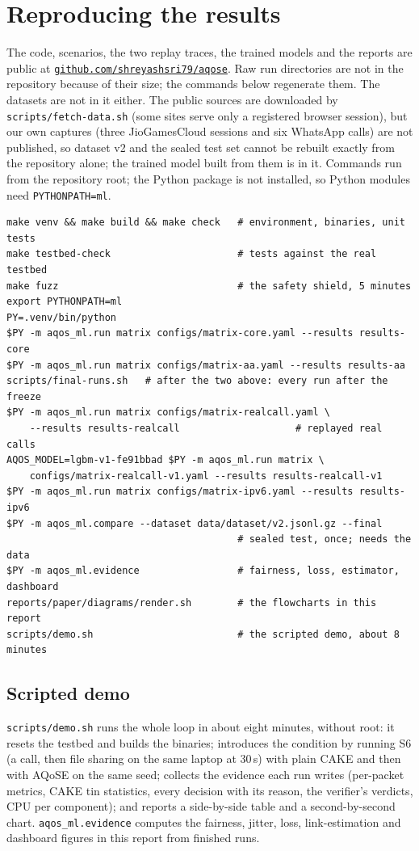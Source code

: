 \documentclass[11pt,a4paper]{article}
\newif\ifnewpage\newpagetrue
\newcommand{\samepagenext}{\global\newpagefalse}
\newcommand{\newpagenext}{\global\newpagetrue}
\begin{document}
\samepagenext
\appendix
\section{Reproducing the results}
\newpagenext
{\sloppy The code, scenarios, the two replay traces, the trained models and the reports are public at \href{https://github.com/shreyashsri79/aqose}{\texttt{github.com/shreyashsri79/aqose}}. Raw run directories are not in the repository because of their size; the commands below regenerate them. The datasets are not in it either. The public sources are downloaded by \texttt{scripts/fetch-data.sh} (some sites serve only a registered browser session), but our own captures (three JioGamesCloud sessions and six WhatsApp calls) are not published, so dataset v2 and the sealed test set cannot be rebuilt exactly from the repository alone; the trained model built from them is in it. Commands run from the repository root; the Python package is not installed, so Python modules need \texttt{PYTHONPATH=ml}.\par}
\begin{verbatim}
make venv && make build && make check   # environment, binaries, unit tests
make testbed-check                      # tests against the real testbed
make fuzz                               # the safety shield, 5 minutes
export PYTHONPATH=ml
PY=.venv/bin/python
$PY -m aqos_ml.run matrix configs/matrix-core.yaml --results results-core
$PY -m aqos_ml.run matrix configs/matrix-aa.yaml --results results-aa
scripts/final-runs.sh   # after the two above: every run after the freeze
$PY -m aqos_ml.run matrix configs/matrix-realcall.yaml \
    --results results-realcall                    # replayed real calls
AQOS_MODEL=lgbm-v1-fe91bbad $PY -m aqos_ml.run matrix \
    configs/matrix-realcall-v1.yaml --results results-realcall-v1
$PY -m aqos_ml.run matrix configs/matrix-ipv6.yaml --results results-ipv6
$PY -m aqos_ml.compare --dataset data/dataset/v2.jsonl.gz --final
                                        # sealed test, once; needs the data
$PY -m aqos_ml.evidence                 # fairness, loss, estimator, dashboard
reports/paper/diagrams/render.sh        # the flowcharts in this report
scripts/demo.sh                         # the scripted demo, about 8 minutes
\end{verbatim}
\subsection*{Scripted demo}
\texttt{scripts/demo.sh} runs the whole loop in about eight minutes, without root: it resets the testbed and builds the binaries; introduces the condition by running S6 (a call, then file sharing on the same laptop at 30\,s) with plain CAKE and then with AQoSE on the same seed; collects the evidence each run writes (per-packet metrics, CAKE tin statistics, every decision with its reason, the verifier's verdicts, CPU per component); and reports a side-by-side table and a second-by-second chart. \texttt{aqos\_ml.evidence} computes the fairness, jitter, loss, link-estimation and dashboard figures in this report from finished runs.
\end{document}
